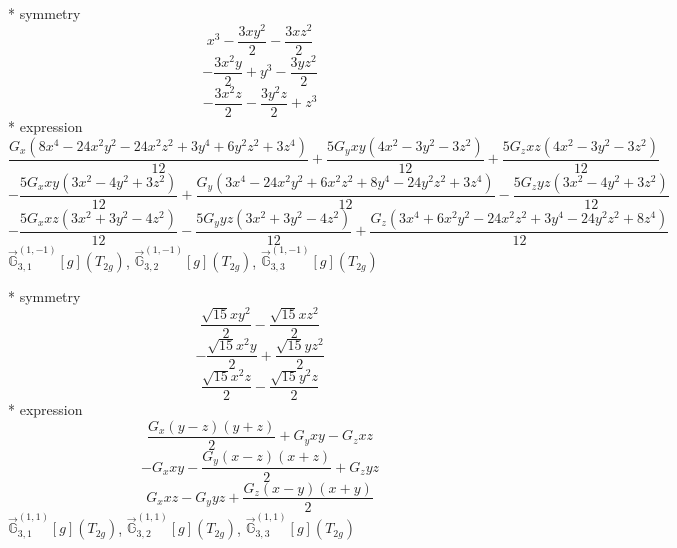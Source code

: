 \documentclass[fleqn,8pt]{jsarticle}
\begin{document}
\noindent\quad ** symmetry
\begin{dmath*}
x^{3} - \frac{3 x y^{2}}{2} - \frac{3 x z^{2}}{2}
\end{dmath*}
\begin{dmath*}
- \frac{3 x^{2} y}{2} + y^{3} - \frac{3 y z^{2}}{2}
\end{dmath*}
\begin{dmath*}
- \frac{3 x^{2} z}{2} - \frac{3 y^{2} z}{2} + z^{3}
\end{dmath*}
\noindent\quad ** expression
\begin{dmath*}
\frac{G_{x} \left(8 x^{4} - 24 x^{2} y^{2} - 24 x^{2} z^{2} + 3 y^{4} + 6 y^{2} z^{2} + 3 z^{4}\right)}{12} + \frac{5 G_{y} x y \left(4 x^{2} - 3 y^{2} - 3 z^{2}\right)}{12} + \frac{5 G_{z} x z \left(4 x^{2} - 3 y^{2} - 3 z^{2}\right)}{12}
\end{dmath*}
\begin{dmath*}
- \frac{5 G_{x} x y \left(3 x^{2} - 4 y^{2} + 3 z^{2}\right)}{12} + \frac{G_{y} \left(3 x^{4} - 24 x^{2} y^{2} + 6 x^{2} z^{2} + 8 y^{4} - 24 y^{2} z^{2} + 3 z^{4}\right)}{12} - \frac{5 G_{z} y z \left(3 x^{2} - 4 y^{2} + 3 z^{2}\right)}{12}
\end{dmath*}
\begin{dmath*}
- \frac{5 G_{x} x z \left(3 x^{2} + 3 y^{2} - 4 z^{2}\right)}{12} - \frac{5 G_{y} y z \left(3 x^{2} + 3 y^{2} - 4 z^{2}\right)}{12} + \frac{G_{z} \left(3 x^{4} + 6 x^{2} y^{2} - 24 x^{2} z^{2} + 3 y^{4} - 24 y^{2} z^{2} + 8 z^{4}\right)}{12}
\end{dmath*}
\noindent\quad $\vec{\mathbb{G}}_{3,1}^{(1,-1)}[g](T_{2g})$, $\vec{\mathbb{G}}_{3,2}^{(1,-1)}[g](T_{2g})$, $\vec{\mathbb{G}}_{3,3}^{(1,-1)}[g](T_{2g})$

\noindent\quad ** symmetry
\begin{dmath*}
\frac{\sqrt{15} x y^{2}}{2} - \frac{\sqrt{15} x z^{2}}{2}
\end{dmath*}
\begin{dmath*}
- \frac{\sqrt{15} x^{2} y}{2} + \frac{\sqrt{15} y z^{2}}{2}
\end{dmath*}
\begin{dmath*}
\frac{\sqrt{15} x^{2} z}{2} - \frac{\sqrt{15} y^{2} z}{2}
\end{dmath*}
\noindent\quad ** expression
\begin{dmath*}
\frac{G_{x} \left(y - z\right) \left(y + z\right)}{2} + G_{y} x y - G_{z} x z
\end{dmath*}
\begin{dmath*}
- G_{x} x y - \frac{G_{y} \left(x - z\right) \left(x + z\right)}{2} + G_{z} y z
\end{dmath*}
\begin{dmath*}
G_{x} x z - G_{y} y z + \frac{G_{z} \left(x - y\right) \left(x + y\right)}{2}
\end{dmath*}
\noindent\quad $\vec{\mathbb{G}}_{3,1}^{(1,1)}[g](T_{2g})$, $\vec{\mathbb{G}}_{3,2}^{(1,1)}[g](T_{2g})$, $\vec{\mathbb{G}}_{3,3}^{(1,1)}[g](T_{2g})$
\end{document}
